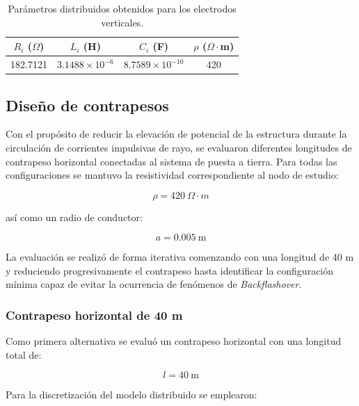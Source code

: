 \documentclass[12pt,letterpaper]{article}
\begin{document}
\begin{table}[H]
\centering
\caption{Parámetros distribuidos obtenidos para los electrodos verticales.}
\label{tab:parametros_varillas}
\renewcommand{\arraystretch}{1.2}
\begin{tabular}{cccc}
\toprule
$R_i$ ($\Omega$) & $L_i$ (H) & $C_i$ (F) & $\rho$ ($\Omega\cdot$m) \\
\midrule
182.7121 & $3.1488\times10^{-6}$ & $8.7589\times10^{-10}$ & 420 \\
\bottomrule
\end{tabular}
\end{table}

\subsection{Diseño de contrapesos}

Con el propósito de reducir la elevación de potencial de la estructura durante la circulación de corrientes impulsivas de rayo, se evaluaron diferentes longitudes de contrapeso horizontal conectadas al sistema de puesta a tierra. Para todas las configuraciones se mantuvo la resistividad correspondiente al nodo de estudio:

\begin{equation*}
\rho = 420\ \Omega\cdot m
\end{equation*}

así como un radio de conductor:

\begin{equation*}
a = 0.005\ \mathrm{m}
\end{equation*}

La evaluación se realizó de forma iterativa comenzando con una longitud de 40 m y reduciendo progresivamente el contrapeso hasta identificar la configuración mínima capaz de evitar la ocurrencia de fenómenos de \textit{Backflashover}.

\subsubsection{Contrapeso horizontal de 40 m}

Como primera alternativa se evaluó un contrapeso horizontal con una longitud total de:

\begin{equation*}
l=40\ \mathrm{m}
\end{equation*}

Para la discretización del modelo distribuido se emplearon:
\end{document}
